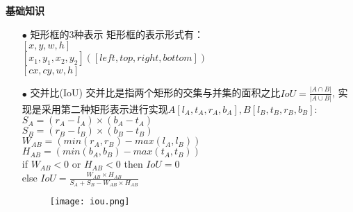 \begin{frame}
    \noindent\large\textbf{基础知识}
    \begin{itemize}
        \item[$ \bullet $] 矩形框的3种表示
            矩形框的表示形式有：\\
            $[x,y,w,h]$ \\
            $[x_1,y_1,x_2,y_2]([left,top,right,bottom])$\\
            $[cx,cy,w,h]$
        \item[$ \bullet $] 交并比(IoU)
            交并比是指两个矩形的交集与并集的面积之比$IoU=\frac{|A\cap B|}{|A\cup B|}$,
            实现是采用第二种矩形表示进行实现$A[l_A,t_A,r_A,b_A],B[l_B,t_B,r_B,b_B]$:\\
            $S_A=(r_A-l_A)\times(b_A-t_A)$\\
            $S_B=(r_B-l_B)\times(b_B-t_B)$\\
            $W_{AB}=(min(r_A,r_B)-max(l_A,l_B))$\\
            $H_{AB}=(min(b_A,b_B)-max(t_A,t_B))$\\
            if $ W_{AB}<0$ or $H_{AB}<0$ then $IoU = 0$\\
            else $IoU=\frac{W_{AB}\times H_{AB}}{S_A+S_B-W_{AB}\times H_{AB}}$
            \vspace{-3.5cm}
            \begin{figure}
                \hspace{6cm}
                \texttt{[image: iou.png]}
            \end{figure}
    \end{itemize}
\end{frame}

